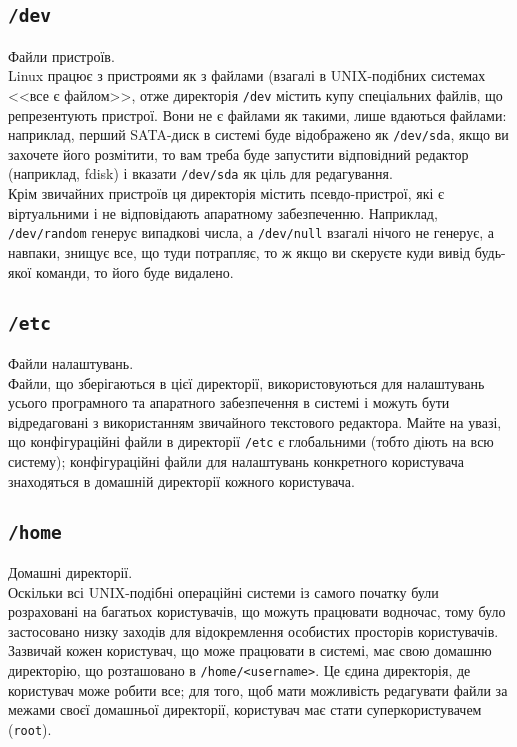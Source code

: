 \documentclass[10pt,a4paper]{fancyhandout}
\begin{document}
	\subsection{\texttt{/dev}}
	Файли пристроїв. \\
	Linux працює з пристроями як з файлами (взагалі в UNIX-подібних системах <<все є файлом>>, отже директорія \texttt{/dev} містить купу спеціальних файлів, що репрезентують пристрої. Вони не є файлами як такими, лише вдаються файлами: наприклад, перший SATA-диск в системі буде відображено як \texttt{/dev/sda}, якщо ви захочете його розмітити, то вам треба буде запустити відповідний редактор (наприклад, fdisk) і вказати \texttt{/dev/sda} як ціль для редагування. \\
	Крім звичайних пристроїв ця директорія містить псевдо-пристрої, які є віртуальними і не відповідають апаратному забезпеченню. Наприклад, \texttt{/dev/random} генерує випадкові числа, а \texttt{/dev/null} взагалі нічого не генерує, а навпаки, знищує все, що туди потрапляє, то ж якщо ви скеруєте куди вивід будь-якої команди, то його буде видалено.
	\goodbreak
	
	\subsection{\texttt{/etc}}
	Файли налаштувань. \\
	Файли, що зберігаються в цієї директорії, використовуються для налаштувань усього програмного та апаратного забезпечення в системі і можуть бути відредаговані з використанням звичайного текстового редактора. Майте на увазі, що конфігураційні файли в директорії \texttt{/etc} є глобальними (тобто діють на всю систему); конфігураційні файли для налаштувань конкретного користувача знаходяться в домашній директорії кожного користувача.
	\goodbreak
	
	\subsection{\texttt{/home}}
	Домашні директорії. \\
	Оскільки всі UNIX-подібні операційні системи із самого початку були розраховані на багатьох користувачів, що можуть працювати водночас, тому було застосовано низку заходів для відокремлення особистих просторів користувачів. Зазвичай кожен користувач, що може працювати в системі, має свою домашню директорію, що розташовано в \texttt{/home/<username>}. Це єдина директорія, де користувач може робити все; для того, щоб мати можливість редагувати файли за межами своєї домашньої директорії, користувач має стати суперкористувачем (\texttt{root}).
	\goodbreak
	
\end{document}
